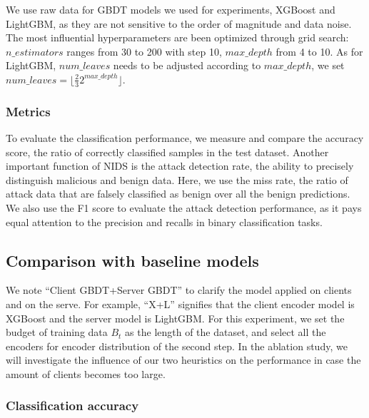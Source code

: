 We use raw data for GBDT models we used for experiments, \ie XGBoost and LightGBM, as they are not sensitive to the order of magnitude and data noise.
The most influential hyperparameters are been optimized through grid search: $n\_estimators$ ranges from 30 to 200 with step 10, $max\_depth$ from 4 to 10. As for LightGBM, $num\_leaves$ needs to be adjusted according to $max\_depth$, we set $num\_leaves = \lfloor \frac{2}{3}2^{max\_depth} \rfloor$.

\subsubsection{Metrics}
To evaluate the classification performance, we measure and compare the accuracy score, \ie the ratio of correctly classified samples in the test dataset.
Another important function of NIDS is the attack detection rate, \ie the ability to precisely distinguish malicious and benign data.
Here, we use the miss rate, \ie the ratio of attack data that are falsely classified as benign over all the benign predictions.
We also use the F1 score to evaluate the attack detection performance, as it pays equal attention to the precision and recalls in binary classification tasks.

\subsection{Comparison with baseline models}

We note ``Client GBDT+Server GBDT'' to clarify the model applied on clients and on the serve.
For example, ``X+L'' signifies that the client encoder model is XGBoost and the server model is LightGBM.
For this experiment, we set the budget of training data $B_t$ as the length of the dataset, and select all the encoders for encoder distribution of the second step.
In the ablation study, we will investigate the influence of our two heuristics on the performance in case the amount of clients becomes too large.



\subsubsection{Classification accuracy}\label{sec:classACC}

